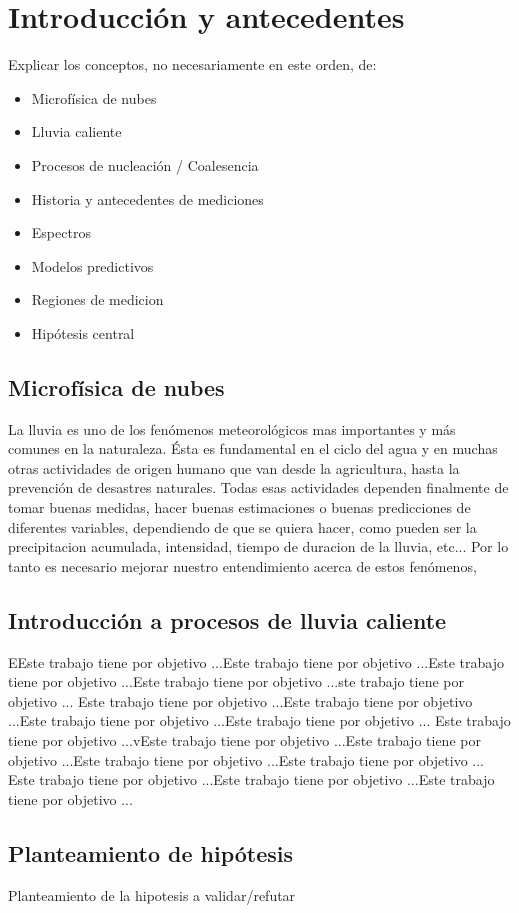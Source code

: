 \chapter{Introducción y antecedentes}
Explicar los conceptos, no necesariamente en este orden, de:
\begin{itemize}
	\item Microfísica de nubes
	\item Lluvia caliente
	\item Procesos de nucleación / Coalesencia
	\item Historia y antecedentes de mediciones
	\item Espectros 
	\item Modelos predictivos
	\item Regiones de medicion 
	\item Hipótesis central
\end{itemize}
\section{Microfísica de nubes} 
La lluvia es uno de los fenómenos meteorológicos mas importantes y más comunes en la naturaleza. Ésta es fundamental en el ciclo del agua y en muchas otras actividades de origen humano que van desde la agricultura, hasta la prevención de desastres naturales. 
Todas esas actividades dependen finalmente de tomar buenas medidas, hacer buenas estimaciones o  buenas predicciones de diferentes variables, dependiendo de que se quiera hacer, como pueden ser la precipitacion acumulada, intensidad, tiempo de duracion de la lluvia, etc...
Por lo tanto es necesario mejorar nuestro entendimiento acerca de estos fenómenos,


\section{Introducción a procesos de lluvia caliente}
EEste trabajo tiene por objetivo ...Este trabajo tiene por objetivo ...Este trabajo tiene por objetivo ...Este trabajo tiene por objetivo ...ste trabajo tiene por objetivo ...
Este trabajo tiene por objetivo ...Este trabajo tiene por objetivo ...Este trabajo tiene por objetivo ...Este trabajo tiene por objetivo ...
Este trabajo tiene por objetivo ...vEste trabajo tiene por objetivo ...Este trabajo tiene por objetivo ...Este trabajo tiene por objetivo ...Este trabajo tiene por objetivo ...
Este trabajo tiene por objetivo ...Este trabajo tiene por objetivo ...Este trabajo tiene por objetivo ...
\section{Planteamiento de hipótesis}
Planteamiento de la hipotesis a validar/refutar